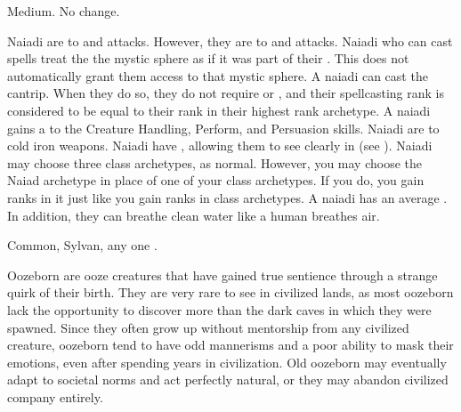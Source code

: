    Medium.
   No change.
  \begin{raggeditemize}
     Naiadi are \resistant to \atFire and \atWater attacks.
      However, they are \vulnerable to \atCold and \atElectricity attacks.
     Naiadi who can cast spells treat the the  mystic sphere as if it was part of their .
      This does not automatically grant them access to that mystic sphere.
     A naiadi can cast the  cantrip.
      When they do so, they do not require  or , and their spellcasting rank is considered to be equal to their rank in their highest rank archetype.
     A naiadi gains a   to the Creature Handling, Perform, and Persuasion skills.
     Naiadi are \vulnerable to cold iron weapons.
     Naiadi have , allowing them to see clearly in  (see ).
     Naiadi may choose three class archetypes, as normal.
      However, you may choose the Naiad archetype in place of one of your class archetypes.
      If you do, you gain ranks in it just like you gain ranks in class archetypes.
     A naiadi has an average .
      In addition, they can breathe clean water like a human breathes air.
  \end{raggeditemize}
   Common, Sylvan, any one .



\label{Oozeborn}
  Oozeborn are ooze creatures that have gained true sentience through a strange quirk of their birth.
  They are very rare to see in civilized lands, as most oozeborn lack the opportunity to discover more than the dark caves in which they were spawned.
  Since they often grow up without mentorship from any civilized creature, oozeborn tend to have odd mannerisms and a poor ability to mask their emotions, even after spending years in civilization.
  Old oozeborn may eventually adapt to societal norms and act perfectly natural, or they may abandon civilized company entirely.

